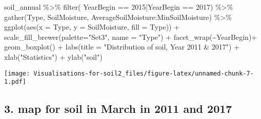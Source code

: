 \documentclass[
]{article}
\newenvironment{Shaded}{\begin{snugshade}}{\end{snugshade}}
\newcommand{\AttributeTok}[1]{\textcolor[rgb]{0.77,0.63,0.00}{#1}}
\newcommand{\DecValTok}[1]{\textcolor[rgb]{0.00,0.00,0.81}{#1}}
\newcommand{\FunctionTok}[1]{\textcolor[rgb]{0.00,0.00,0.00}{#1}}
\newcommand{\NormalTok}[1]{#1}
\newcommand{\SpecialCharTok}[1]{\textcolor[rgb]{0.00,0.00,0.00}{#1}}
\newcommand{\StringTok}[1]{\textcolor[rgb]{0.31,0.60,0.02}{#1}}
\begin{document}
\begin{Shaded}
\begin{Highlighting}[]
\NormalTok{soil\_annual }\SpecialCharTok{\%\textgreater{}\%} 
  \FunctionTok{filter}\NormalTok{( YearBegin }\SpecialCharTok{==} \DecValTok{2015}\SpecialCharTok{|}\NormalTok{YearBegin }\SpecialCharTok{==} \DecValTok{2017}\NormalTok{) }\SpecialCharTok{\%\textgreater{}\%} 
  \FunctionTok{gather}\NormalTok{(Type, SoilMoisture, AverageSoilMoisture}\SpecialCharTok{:}\NormalTok{MinSoilMoisture) }\SpecialCharTok{\%\textgreater{}\%} 
  \FunctionTok{ggplot}\NormalTok{(}\FunctionTok{aes}\NormalTok{(}\AttributeTok{x =}\NormalTok{ Type, }\AttributeTok{y =}\NormalTok{ SoilMoisture, }\AttributeTok{fill =}\NormalTok{ Type)) }\SpecialCharTok{+}
  \FunctionTok{scale\_fill\_brewer}\NormalTok{(}\AttributeTok{palette=}\StringTok{"Set3"}\NormalTok{, }\AttributeTok{name =} \StringTok{"Type"}\NormalTok{) }\SpecialCharTok{+}
  \FunctionTok{facet\_wrap}\NormalTok{(}\SpecialCharTok{\textasciitilde{}}\NormalTok{YearBegin)}\SpecialCharTok{+}
  \FunctionTok{geom\_boxplot}\NormalTok{() }\SpecialCharTok{+}
  \FunctionTok{labs}\NormalTok{(}\AttributeTok{title =} \StringTok{"Distribution of soil, Year 2011 \& 2017"}\NormalTok{) }\SpecialCharTok{+}
    \FunctionTok{xlab}\NormalTok{(}\StringTok{"Statistics"}\NormalTok{) }\SpecialCharTok{+}
    \FunctionTok{ylab}\NormalTok{(}\StringTok{"soil"}\NormalTok{)}
\end{Highlighting}
\end{Shaded}

\texttt{[image: Visualisations-for-soil2\_files/figure-latex/unnamed-chunk-7-1.pdf]}

\hypertarget{map-for-soil-in-march-in-2011-and-2017}{%
\subsection{3. map for soil in March in 2011 and
2017}\label{map-for-soil-in-march-in-2011-and-2017}}
\end{document}
